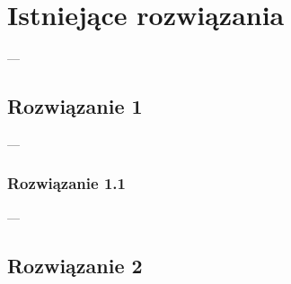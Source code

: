 
\chapter{Istniejące rozwiązania}
---
\section{Rozwiązanie 1}
---
\subsection{Rozwiązanie 1.1}
---
\section{Rozwiązanie 2}
